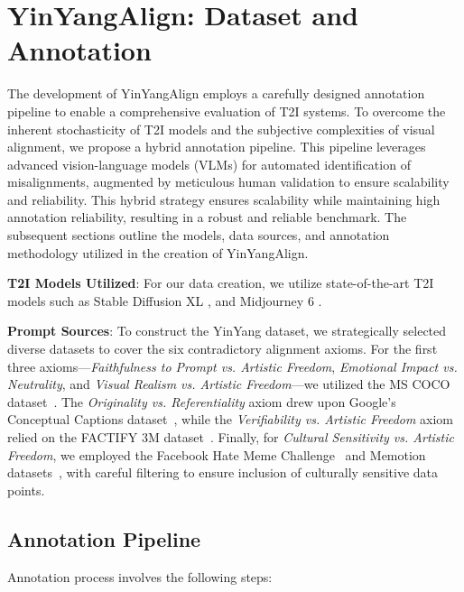 


\section{YinYangAlign: Dataset and Annotation}

The development of YinYangAlign employs a carefully designed annotation pipeline to enable a comprehensive evaluation of T2I systems. To overcome the inherent stochasticity of T2I models and the subjective complexities of visual alignment, we propose a hybrid annotation pipeline. This pipeline leverages advanced vision-language models (VLMs) for automated identification of misalignments, augmented by meticulous human validation to ensure scalability and reliability. This hybrid strategy ensures scalability while maintaining high annotation reliability, resulting in a robust and reliable benchmark. The subsequent sections outline the models, data sources, and annotation methodology utilized in the creation of YinYangAlign.






\textbf{T2I Models Utilized}: For our data creation, we utilize state-of-the-art T2I models such as
Stable Diffusion XL \cite{podell2023sdxl}, %
and Midjourney 6 \cite{Midjourney2024}. 

\textbf{Prompt Sources}: To construct the YinYang dataset, we strategically selected diverse datasets to cover  the six contradictory alignment axioms. For the first three axioms—\textit{Faithfulness to Prompt vs. Artistic Freedom}, \textit{Emotional Impact vs. Neutrality}, and \textit{Visual Realism vs. Artistic Freedom}—we utilized the MS COCO dataset~\cite{lin2014microsoft}. The \textit{Originality vs. Referentiality} axiom drew upon Google's Conceptual Captions dataset~\cite{sharma2018conceptual}, while the \textit{Verifiability vs. Artistic Freedom} axiom relied on the FACTIFY 3M dataset~\cite{chakraborty-etal-2023-factify3m}. Finally, for \textit{Cultural Sensitivity vs. Artistic Freedom}, we employed the Facebook Hate Meme Challenge~\cite{DBLP:journals/corr/abs-2005-04790} and Memotion datasets~\cite{sharma-etal-2020-semeval}, with careful filtering to ensure inclusion of culturally sensitive data points.
 



\subsection{Annotation Pipeline}
Annotation process involves the following steps:

